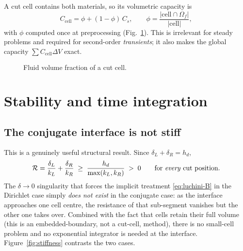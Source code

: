 \documentclass[11pt,a4paper]{article}
\newcommand{\Rser}{\mathcal{R}}
\begin{document}
A cut cell contains both materials, so its volumetric capacity is
\begin{equation}
  C_{\text{cell}} = \phi + (1-\phi)\,C_s,
  \qquad
  \phi = \frac{|\text{cell}\cap\Omega_f|}{|\text{cell}|},
\end{equation}
with $\phi$ computed once at preprocessing (Fig.~\ref{fig:capacity}). This is
irrelevant for steady problems and required for second-order \emph{transients};
it also makes the global capacity $\sum C_{\text{cell}}\Delta V$ exact.

\begin{figure}[htbp]
\centering
{}
\caption{Fluid volume fraction of a cut cell.}
\label{fig:capacity}
\end{figure}

\section{Stability and time integration}
\label{sec:stability}

\subsection{The conjugate interface is not stiff}

This is a genuinely useful structural result. Since
$\delta_L+\delta_R=h_d$,
\begin{equation}
  \Rser=\frac{\delta_L}{k_L}+\frac{\delta_R}{k_R}
       \;\ge\; \frac{h_d}{\max(k_L,k_R)} \;>\;0
  \qquad\text{for \emph{every} cut position.}
\end{equation}
The $\delta\to0$ singularity that forces the implicit treatment
\eqref{eq:luchini-B} in the Dirichlet case simply \emph{does not exist} in the
conjugate case: as the interface approaches one cell centre, the resistance of
that sub-segment vanishes but the other one takes over. Combined with the fact
that cells retain their full volume (this is an embedded-boundary, not a
cut-cell, method), there is no small-cell problem and no exponential integrator
is needed at the interface. Figure~\ref{fig:stiffness} contrasts the two cases.
\end{document}
